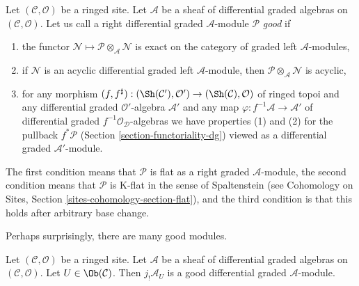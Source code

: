 \medskip\noindent
Let $(\mathcal{C}, \mathcal{O})$ be a ringed site.
Let $\mathcal{A}$ be a sheaf of differential graded algebras
on $(\mathcal{C}, \mathcal{O})$. Let us call a right differential
graded $\mathcal{A}$-module $\mathcal{P}$ {\it good}
if
\begin{enumerate}
\item the functor
$\mathcal{N} \mapsto \mathcal{P} \otimes_\mathcal{A} \mathcal{N}$
is exact on the category of graded left $\mathcal{A}$-modules,
\item if $\mathcal{N}$ is an acyclic differential graded left
$\mathcal{A}$-module, then
$\mathcal{P} \otimes_\mathcal{A} \mathcal{N}$ is acyclic,
\item for any morphism $(f, f^\sharp) : (\Sh(\mathcal{C}'), \mathcal{O}')
\to (\Sh(\mathcal{C}), \mathcal{O})$
of ringed topoi and any differential graded $\mathcal{O}'$-algebra
$\mathcal{A}'$ and any map $\varphi : f^{-1}\mathcal{A} \to \mathcal{A}'$
of differential graded $f^{-1}\mathcal{O}_\mathcal{D}$-algebras we have
properties (1) and (2) for the pullback $f^*\mathcal{P}$
(Section \ref{section-functoriality-dg})
viewed as a differential graded $\mathcal{A}'$-module.
\end{enumerate}
The first condition means that $\mathcal{P}$ is flat as a right graded
$\mathcal{A}$-module, the second condition means that $\mathcal{P}$ is
K-flat in the sense of Spaltenstein (see Cohomology on
Sites, Section \ref{sites-cohomology-section-flat}), and
the third condition is that this holds after arbitrary base change.

\medskip\noindent
Perhaps surprisingly, there are many good modules.

\begin{lemma}
\label{lemma-supply-good}
Let $(\mathcal{C}, \mathcal{O})$ be a ringed site.
Let $\mathcal{A}$ be a sheaf of differential graded algebras
on $(\mathcal{C}, \mathcal{O})$. Let $U \in \Ob(\mathcal{C})$.
Then $j_!\mathcal{A}_U$ is a good differential graded
$\mathcal{A}$-module.
\end{lemma}

